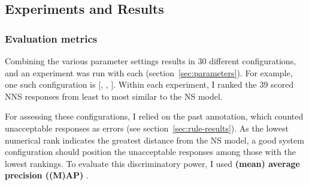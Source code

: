 \subsection{Experiments and Results}
\label{sec:metrics}
\subsubsection{Evaluation metrics}

Combining the various parameter settings results in 30 different configurations, and an experiment was run with each (section~\ref{sec:parameters}). For example, one such configuration is $[$, , $]$.
Within each experiment, I ranked the 39 scored NNS responses from least to most similar to the NS model.

For assessing these configurations, I relied on the past annotation, which counted unacceptable responses as errors (see section~\ref{sec:rule-results}).  As the lowest numerical rank indicates the greatest distance from the NS model, a good system configuration should position the unacceptable responses among those with the lowest rankings.
To evaluate this discriminatory power, I used \textbf{(mean) average precision ((M)AP)}
\citep[][ch. 8]{schutze2008introduction}. 


